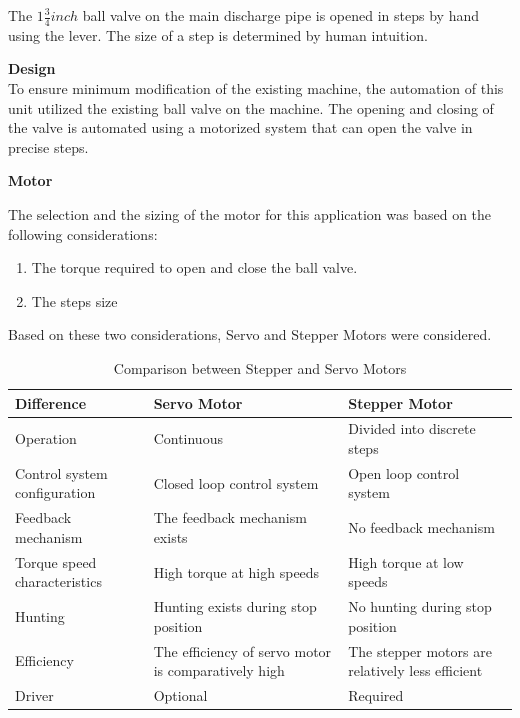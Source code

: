 \par
The $1 \frac{3}{4} inch $ ball valve on the main discharge pipe is opened in steps by hand using the lever. The size of a step is determined by human intuition.
\par
\textbf{Design}\\
To ensure minimum modification of the existing machine, the automation of this unit utilized the existing ball valve on the machine. The opening and closing of the valve is automated using a motorized system that can open the valve in precise steps.
\par
\textbf{Motor}
\par
The selection and the sizing of the motor for this application was based on the following considerations:

\begin{enumerate}
    \item The torque required to open and close the ball valve.
    \item The steps size 
\end{enumerate}
\par
Based on these two considerations, Servo and Stepper Motors were considered.
  \begin{table}[H]
    \centering
      \caption[Stepper versus Servo Motor]{Comparison between Stepper and Servo Motors \cite{nema17}\cite{mg996r}}
    \begin{tabular}{|m{5cm}|m{5cm}|m{5cm}|}
    \hline
  Difference & Servo Motor & Stepper Motor \\ \hline 
Operation &  Continuous &  Divided into discrete steps \\ \hline
Control system configuration & Closed loop control system & Open loop control system\\ \hline
Feedback mechanism & The feedback mechanism exists  &  No feedback mechanism \\ \hline
Torque speed characteristics &  High torque at high speeds &  High torque at low speeds \\ \hline
Hunting & Hunting exists during stop position &  No hunting during stop position \\ \hline
Efficiency & The efficiency of servo motor is comparatively high & The stepper motors are relatively less efficient  \\ \hline
Driver & Optional & Required \\ \hline
    \end{tabular}
    \label{tab:XLA_stuff}
    \end{table}
